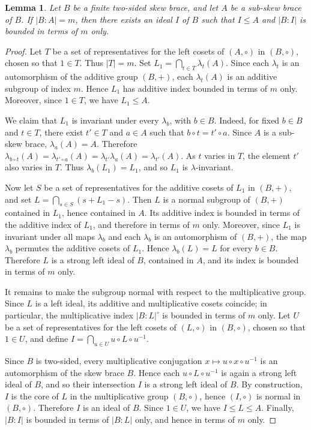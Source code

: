 \documentclass[11pt, oneside]{amsart}
\numberwithin{equation}{section}
\theoremstyle{plain}
\newtheorem{lem}[equation]{Lemma}
\theoremstyle{definition}
\begin{document}
\begin{lem}\label{lem:finite-index-ideal-core-two-sided}
Let $B$ be a finite two-sided skew brace, and let $A$ be a sub-skew brace of $B$.
If $|B:A|=m$, then there exists an ideal $I$ of $B$ such that $I\leqslant A$ and
$|B:I|$ is bounded in terms of $m$ only.
\end{lem}

\begin{proof}
Let $T$ be a set of representatives for the left cosets of $(A,\circ)$ in
$(B,\circ)$, chosen so that $1\in T$. Thus $|T|=m$. Set
$L_1=\bigcap_{t\in T}\lambda_t(A)$. Since each $\lambda_t$ is an automorphism
of the additive group $(B,+)$, each $\lambda_t(A)$ is an additive subgroup of
index $m$. Hence $L_1$ has additive index bounded in terms of $m$ only.
Moreover, since $1\in T$, we have $L_1\leqslant A$.

We claim that $L_1$ is invariant under every $\lambda_b$, with $b\in B$. Indeed,
for fixed $b\in B$ and $t\in T$, there exist $t'\in T$ and $a\in A$ such that
$b\circ t=t'\circ a$. Since $A$ is a sub-skew brace, $\lambda_a(A)=A$. Therefore
$\lambda_{b\circ t}(A)=\lambda_{t'\circ a}(A)=\lambda_{t'}\lambda_a(A)
=\lambda_{t'}(A)$. As $t$ varies in $T$, the element $t'$ also varies in $T$.
Thus $\lambda_b(L_1)=L_1$, and so $L_1$ is $\lambda$-invariant.

Now let $S$ be a set of representatives for the additive cosets of $L_1$ in
$(B,+)$, and set $L=\bigcap_{s\in S}(s+L_1-s)$. Then $L$ is a normal subgroup
of $(B,+)$ contained in $L_1$, hence contained in $A$. Its additive index is
bounded in terms of the additive index of $L_1$, and therefore in terms of $m$
only. Moreover, since $L_1$ is invariant under all maps $\lambda_b$ and each
$\lambda_b$ is an automorphism of $(B,+)$, the map $\lambda_b$ permutes the
additive cosets of $L_1$. Hence $\lambda_b(L)=L$ for every $b\in B$. Therefore
$L$ is a strong left ideal of $B$, contained in $A$, and its index is bounded
in terms of $m$ only.

It remains to make the subgroup normal with respect to the multiplicative
group. Since $L$ is a left ideal, its additive and multiplicative cosets
coincide; in particular, the multiplicative index $|B:L|^{\circ}$ is bounded
in terms of $m$ only. Let $U$ be a set of representatives for the left cosets
of $(L,\circ)$ in $(B,\circ)$, chosen so that $1\in U$, and define
$I=\bigcap_{u\in U}u\circ L\circ u^{-1}$.

Since $B$ is two-sided, every multiplicative conjugation $x\mapsto u\circ x
\circ u^{-1}$ is an automorphism of the skew brace $B$. Hence each
$u\circ L\circ u^{-1}$ is again a strong left ideal of $B$, and so their
intersection $I$ is a strong left ideal of $B$. By construction, $I$ is the
core of $L$ in the multiplicative group $(B,\circ)$, hence $(I,\circ)$ is
normal in $(B,\circ)$. Therefore $I$ is an ideal of $B$. Since $1\in U$, we
have $I\leqslant L\leqslant A$. Finally, $|B:I|$ is bounded in terms of $|B:L|$ only,
and hence in terms of $m$ only.
\end{proof}
\end{document}
